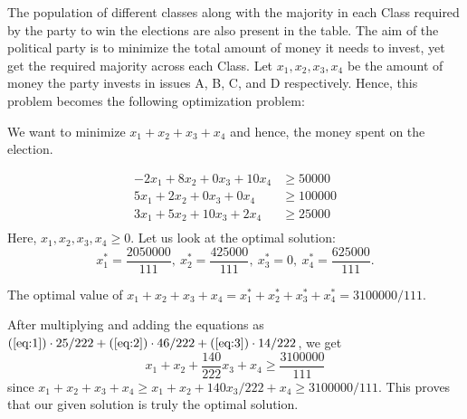 \documentclass[twoside]{article}
\begin{document}
The population of different classes along with the majority in each Class
required by the party to win the elections are also present in the table. The
aim of the political party is to minimize the total amount of money it needs to
invest, yet get the required majority across each Class. Let $x_1, x_2,x_3,x_4$
be the amount of money the party invests in issues A, B, C, and D respectively.
Hence, this problem becomes the following optimization problem:

We want to minimize $x_1+x_2+x_3+x_4$ and hence, the money spent on the election.

\begin{align}
    -2x_1 + 8x_2 +  0x_3 + 10x_4 &\geq 50000  \label{eq:1} \\
     5x_1 + 2x_2 +  0x_3 +  0x_4 &\geq 100000 \label{eq:2} \\
     3x_1 + 5x_2 + 10x_3 +  2x_4 &\geq 25000  \label{eq:3} \\
\end{align}
Here, $x_1,x_2,x_3,x_4 \geq 0.$ Let us look at the optimal solution: \[
    x_1^* = \frac{2050000}{111},\ x_2^* = \frac{425000}{111},\
    x_3^* = 0,\ x_4^* = \frac{625000}{111}.
\] 

The optimal value of
$x_1 + x_2 + x_3 + x_4 = x_1^* + x_2^* + x_3^* + x_4^* = 3100000/111.$

After multiplying and adding the equations as
$(\ref{eq:1}) \cdot 25/222 + (\ref{eq:2}) \cdot 46/222 + (\ref{eq:3}) \cdot 14/222$,
we get \[
        x_1 + x_2 + \frac{140}{222}x_3 + x_4 \geq \frac{3100000}{111}
\] since $x_1 + x_2 + x_3 + x_4 \geq x_1 + x_2 + 140 x_3/222 + x_4 \geq 3100000/111.$
This proves that our given solution is truly the optimal solution.
\end{document}
